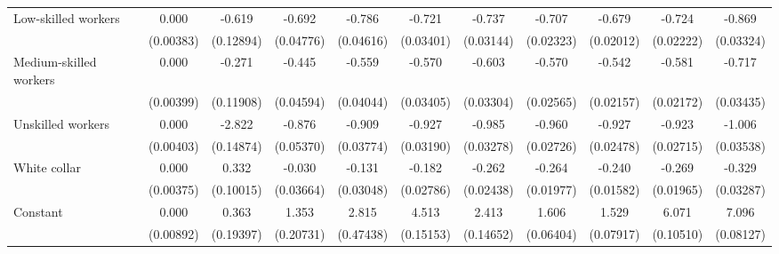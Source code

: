{\begin{tabular}{l*{10}{c}}
Low-skilled workers &       0.000         &      -0.619\sym{***}&      -0.692\sym{***}&      -0.786\sym{***}&      -0.721\sym{***}&      -0.737\sym{***}&      -0.707\sym{***}&      -0.679\sym{***}&      -0.724\sym{***}&      -0.869\sym{***}\\
                    &   (0.00383)         &   (0.12894)         &   (0.04776)         &   (0.04616)         &   (0.03401)         &   (0.03144)         &   (0.02323)         &   (0.02012)         &   (0.02222)         &   (0.03324)         \\
Medium-skilled workers&       0.000         &      -0.271\sym{*}  &      -0.445\sym{***}&      -0.559\sym{***}&      -0.570\sym{***}&      -0.603\sym{***}&      -0.570\sym{***}&      -0.542\sym{***}&      -0.581\sym{***}&      -0.717\sym{***}\\
                    &   (0.00399)         &   (0.11908)         &   (0.04594)         &   (0.04044)         &   (0.03405)         &   (0.03304)         &   (0.02565)         &   (0.02157)         &   (0.02172)         &   (0.03435)         \\
Unskilled workers   &       0.000         &      -2.822\sym{***}&      -0.876\sym{***}&      -0.909\sym{***}&      -0.927\sym{***}&      -0.985\sym{***}&      -0.960\sym{***}&      -0.927\sym{***}&      -0.923\sym{***}&      -1.006\sym{***}\\
                    &   (0.00403)         &   (0.14874)         &   (0.05370)         &   (0.03774)         &   (0.03190)         &   (0.03278)         &   (0.02726)         &   (0.02478)         &   (0.02715)         &   (0.03538)         \\
White collar        &       0.000         &       0.332\sym{***}&      -0.030         &      -0.131\sym{***}&      -0.182\sym{***}&      -0.262\sym{***}&      -0.264\sym{***}&      -0.240\sym{***}&      -0.269\sym{***}&      -0.329\sym{***}\\
                    &   (0.00375)         &   (0.10015)         &   (0.03664)         &   (0.03048)         &   (0.02786)         &   (0.02438)         &   (0.01977)         &   (0.01582)         &   (0.01965)         &   (0.03287)         \\
Constant            &       0.000         &       0.363         &       1.353\sym{***}&       2.815\sym{***}&       4.513\sym{***}&       2.413\sym{***}&       1.606\sym{***}&       1.529\sym{***}&       6.071\sym{***}&       7.096\sym{***}\\
                    &   (0.00892)         &   (0.19397)         &   (0.20731)         &   (0.47438)         &   (0.15153)         &   (0.14652)         &   (0.06404)         &   (0.07917)         &   (0.10510)         &   (0.08127)         \\

\end{tabular}}
